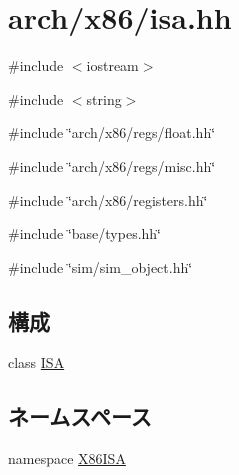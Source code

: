 \hypertarget{x86_2isa_8hh}{
\section{arch/x86/isa.hh}
\label{x86_2isa_8hh}
}
{\ttfamily \#include $<$iostream$>$}\par
{\ttfamily \#include $<$string$>$}\par
{\ttfamily \#include \char`\"{}arch/x86/regs/float.hh\char`\"{}}\par
{\ttfamily \#include \char`\"{}arch/x86/regs/misc.hh\char`\"{}}\par
{\ttfamily \#include \char`\"{}arch/x86/registers.hh\char`\"{}}\par
{\ttfamily \#include \char`\"{}base/types.hh\char`\"{}}\par
{\ttfamily \#include \char`\"{}sim/sim\_\-object.hh\char`\"{}}\par
\subsection*{構成}
\begin{DoxyCompactItemize}
\item 
class \hyperlink{classX86ISA_1_1ISA}{ISA}
\end{DoxyCompactItemize}
\subsection*{ネームスペース}
\begin{DoxyCompactItemize}
\item 
namespace \hyperlink{namespaceX86ISA}{X86ISA}
\end{DoxyCompactItemize}

